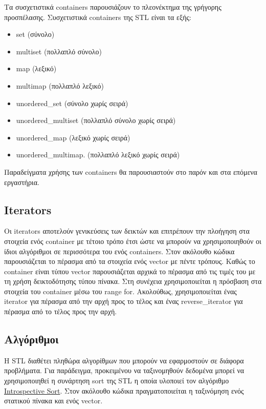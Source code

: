 Τα συσχετιστικά containers παρουσιάζουν το πλεονέκτημα της γρήγορης προσπέλασης. Συσχετιστικά containers της STL είναι τα εξής: 
\begin{itemize}[noitemsep]
\item set (σύνολο)
\item multiset (πολλαπλό σύνολο)
\item map (λεξικό)
\item multimap (πολλαπλό λεξικό)
\item unordered\_set (σύνολο χωρίς σειρά)
\item unordered\_multiset (πολλαπλό σύνολο χωρίς σειρά)
\item unordered\_map (λεξικό χωρίς σειρά)
\item unordered\_multimap. (πολλαπλό λεξικό χωρίς σειρά)
\end{itemize}

Παραδείγματα χρήσης των containers θα παρουσιαστούν στο παρόν και στα επόμενα εργαστήρια.

\subsection{Iterators}
Οι iterators αποτελούν γενικεύσεις των δεικτών και επιτρέπουν την πλοήγηση στα στοιχεία ενός container με τέτοιο τρόπο έτσι ώστε να μπορούν να χρησιμοποιηθούν οι ίδιοι αλγόριθμοι σε περισσότερα του ενός containers. Στον ακόλουθο κώδικα παρουσιάζεται το πέρασμα από τα στοιχεία ενός vector με πέντε τρόπους. Καθώς το container είναι τύπου vector παρουσιάζεται αρχικά το πέρασμα από τις τιμές του με τη χρήση δεικτοδότησης τύπου πίνακα. Στη συνέχεια χρησιμοποιείται η πρόσβαση στα στοιχεία του container μέσω του range for. Ακολούθως, χρησιμοποιείται ένας iterator για πέρασμα από την αρχή προς το τέλος και ένας reverse\_iterator για πέρασμα από το τέλος προς την αρχή. 





\subsection{Αλγόριθμοι}
H STL διαθέτει πληθώρα αλγορίθμων που μπορούν να εφαρμοστούν σε διάφορα προβλήματα. Για παράδειγμα, προκειμένου να ταξινομηθούν δεδομένα μπορεί να χρησιμοποιηθεί η συνάρτηση sort της STL η οποία υλοποιεί τον αλγόριθμο \href{https://xlinux.nist.gov/dads/HTML/introspectiveSort.html}{Introspective Sort}. Στον ακόλουθο κώδικα πραγματοποιείται η ταξινόμηση ενός στατικού πίνακα και ενός vector.

